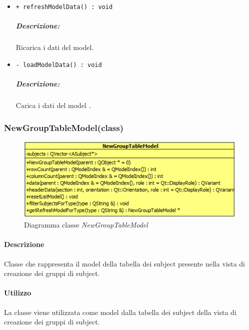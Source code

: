 {\begin{itemize}
\begin{itemize}
			\item \color{RoyalPurple}\verb! role : int!\\
			\color{black}Regola di visualizzazione Qt\g{}.
		\end{itemize}
	\subparagraph{Note}
			\begin{itemize}
				\item Il metodo è costante.
			\end{itemize}
		
	\item \color{blue}\verb!+ refreshModelData() : void!\\
		\color{black}
		\subparagraph{Descrizione:} Ricarica i dati del model.\\
			
	\item \color{blue}\verb!- loadModelData() : void!\\
		\color{black}
		\subparagraph{Descrizione:} Carica i dati del model .\\
\end{itemize}
\pagebreak


\subsubsection{NewGroupTableModel(class)}
\label{NewGroupTableModel}
\begin{figure}[!h]
	\centering
	\includegraphics[width=0.6\linewidth]{./Content/Immagini/QtModel/NewGroupTableModel.png}
	\caption{Diagramma classe \textsl{NewGroupTableModel}}
	\label{comp_NewGroupTableModel}
\end{figure}

\paragraph{Descrizione\\} 
Classe che rappresenta il model della tabella dei subject\g{} presente nella vista di creazione dei gruppi di subject\g{}.

\paragraph{Utilizzo\\}
La classe viene utilizzata come model dalla tabella dei subject\g{} della vista di creazione dei gruppi di subject\g{}.

}
